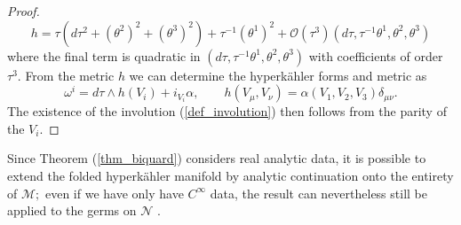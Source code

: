\documentclass[a4paper,12pt, onecolumn, notitlepage]{article}
\theoremstyle{definition}
\theoremstyle{remark}
\newcommand{\al}{\alpha}
\newcommand{\w}{\omega}
\newcommand{\m}{\mu}
\newcommand{\n}{\nu}
\newcommand{\HK}{hyperk\"ahler }
\begin{document}
\begin{proof}
\begin{equation*}
		h = \tau(d\tau^{2}+(\theta^{2})^{2} + (\theta^{3})^{2}) + \tau^{-1}(\theta^{1})^{2} + \mathcal{O}(\tau^{3})(d\tau,\tau^{-1}\theta^{1},\theta^{2},\theta^{3})
	\end{equation*}
	where the final term is quadratic in $(d\tau,\tau^{-1}\theta^{1},\theta^{2},\theta^{3})$ with coefficients of order $\tau^{3}.$ From the metric $h$ we can determine the \HK forms and metric as
	\begin{equation*}
		\w^{i}=d\tau\wedge h(V_{i}) + i_{V_{i}}\al,\qquad h(V_{\m},V_{\n})=\al(V_{1},V_{2},V_{3})\delta_{\m\n}.
	\end{equation*}
	The existence of the involution (\ref{def_involution}) then follows from the parity of the $V_{i}.$
\end{proof}
Since Theorem (\ref{thm_biquard}) considers real analytic data, it is possible to extend the folded \HK manifold by analytic continuation onto the entirety of $\mathcal{M};$ even if we have only have $C^{\infty}$ data, the result can nevertheless still be applied to the germs on $\mathcal{N}$ \cite{biquard_2015}.
\end{document}
